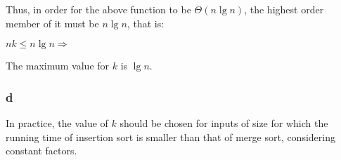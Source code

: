 \documentclass[8pt,a4paper]{article}
\begin{document}
Thus, in order for the above function to be $\Theta(n \lg n)$, the highest order
member of it must be $n \lg n$, that is:

\begin{center}
$nk \leq n \lg n \Rightarrow$
\end{center}

The maximum value for $k$ is $\lg n$.

\subsubsection*{d}

In practice, the value of $k$ should be chosen for inputs of size for which
the running time of insertion sort is smaller than that of merge sort, considering
constant factors.
\end{document}
